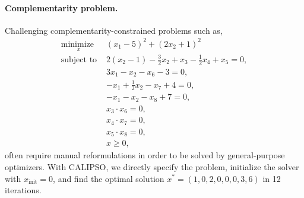 \paragraph{Complementarity problem.}
Challenging complementarity-constrained problems such as, 
\begin{equation}
	\begin{array}{ll}
		\underset{x}{\mbox{minimize }} & (x_1 - 5)^2 + (2x_2 + 1)^2 \\
		\mbox{subject to } & 2 (x_2 -1) - \frac{3}{2} x_2 + x_3 - \frac{1}{2} x_4 + x_5 = 0, \\
		& 3 x_1 - x_2 - x_6 - 3 = 0, \\
		& -x_1 + \frac{1}{2} x_2 - x_7 + 4 = 0, \\ 
		& -x_1 - x_2 - x_8 + 7 = 0, \\ 
		& x_3 \cdot x_6 = 0, \\
		& x_4 \cdot x_7 = 0, \\ 
		& x_5 \cdot x_8 = 0, \\
		& x \geq 0,
	\end{array}
	\label{knitro_problem}
\end{equation}
often require manual reformulations in order to be solved by general-purpose optimizers. With CALIPSO, we directly specify the problem, initialize the solver with $x_{\mbox{init}} = 0$, and find the optimal solution $x^* = (1, 0, 2, 0, 0, 0, 3, 6)$ in 12 iterations.

